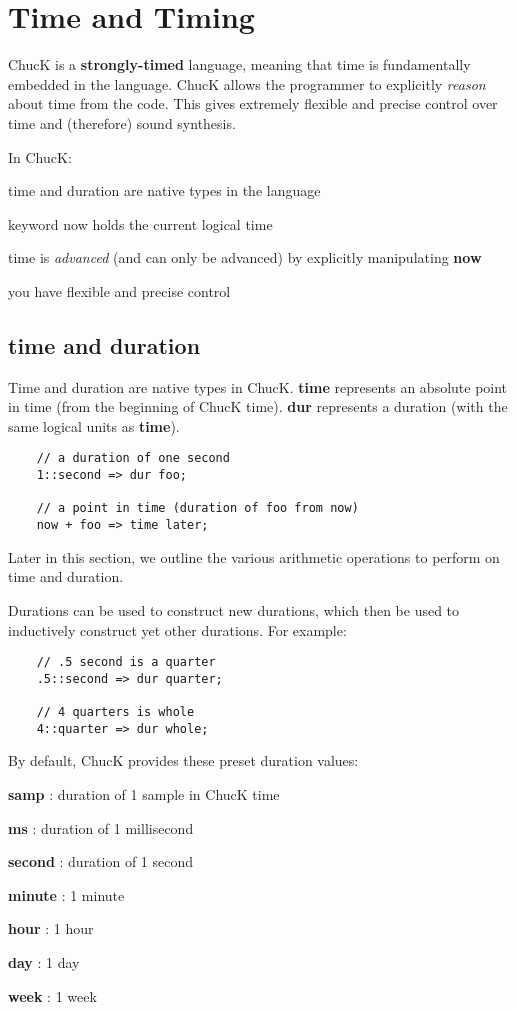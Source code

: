 \chapter{Time and Timing}

ChucK is a {\bf strongly-timed} language, meaning that time is fundamentally embedded in the language. ChucK allows the programmer to explicitly {\it reason} about time from the code. This gives extremely flexible and precise control over time and (therefore) sound synthesis.

In ChucK:

\begin{chuckitemize}
\item time and duration are native types in the language
\item keyword now holds the current logical time
\item time is {\it advanced} (and can only be advanced) by explicitly manipulating {\bf now}
\item you have flexible and precise control
\end{chuckitemize}


\section{time and duration}

Time and duration are native types in ChucK. {\bf time} represents an absolute point in time (from the beginning of ChucK time). {\bf dur} represents a duration (with the same logical units as {\bf time}).
\begin{verbatim}
    // a duration of one second
    1::second => dur foo;

    // a point in time (duration of foo from now)
    now + foo => time later;
\end{verbatim}
Later in this section, we outline the various arithmetic operations to perform on time and duration.

Durations can be used to construct new durations, which then be used to inductively construct yet other durations. For example:
\begin{verbatim}
    // .5 second is a quarter
    .5::second => dur quarter;

    // 4 quarters is whole
    4::quarter => dur whole;
\end{verbatim}

By default, ChucK provides these preset duration values:
\begin{chuckitemize}
\item {\bf samp} : duration of 1 sample in ChucK time
\item {\bf ms} : duration of 1 millisecond
\item {\bf second} : duration of 1 second
\item {\bf minute} : 1 minute
\item {\bf hour} : 1 hour
\item {\bf day} : 1 day
\item {\bf week} : 1 week
\end{chuckitemize}


